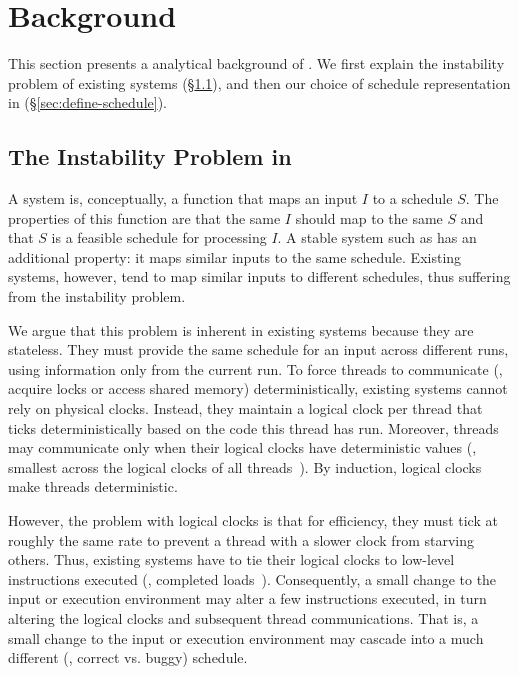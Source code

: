 \section{Background}
\label{sec:background}

This section presents a analytical background of \tern. We first explain the instability
problem of existing \dmt systems (\S\ref{sec:dmt-background}), and then our choice
of schedule representation in \tern (\S\ref{sec:define-schedule}).

\subsection{The Instability Problem in \dmt} \label{sec:dmt-background}

A \dmt system is, conceptually, a function that maps an input $I$ to a
schedule $S$.  The properties of this function are that the same $I$
should map to the same $S$ and that $S$ is a feasible schedule for
processing $I$.  A stable \dmt system such as \tern has an additional
property: it maps similar inputs to the same schedule.  Existing \dmt
systems, however, tend to map similar inputs to different schedules, thus
suffering from the instability problem.  

We argue that this problem is inherent in existing \dmt systems because
they are stateless.  They must provide the same schedule for an input
across different runs, using information only from the current run.
To force threads to communicate (\eg, acquire locks or access shared memory)
deterministically, existing \dmt systems cannot rely on physical clocks.  Instead, they
maintain a logical clock per thread that ticks deterministically based on
the code this thread has run.  Moreover, threads may communicate only when
their logical clocks have deterministic values (\eg, smallest across the
logical clocks of all threads~\cite{kendo:asplos09}).  By induction,
logical clocks make threads deterministic.

However, the problem with logical clocks is that for efficiency,
they must tick at
roughly the same rate to prevent a thread with a slower clock from
starving others.  Thus, existing \dmt systems have to tie their logical
clocks to low-level instructions executed (\eg, completed
loads~\cite{kendo:asplos09}).  Consequently, a small change to the input or
execution environment may alter a few instructions executed, in turn
altering the logical clocks and subsequent thread communications.  That is,
a small change to the input or execution environment may cascade into a
much different (\eg, correct vs. buggy) schedule.  







